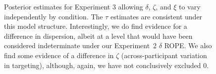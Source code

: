 \documentclass[doc,biblatex,floatsintext]{apa7}
\begin{document}
\begin{figure}
\vspace*{2pt}
\caption{Posterior estimates for Experiment 3 allowing $\delta$, $\zeta$, and $\xi$ to vary independently by condition. The $\tau$ estimates are consistent under this model structure. Interestingly, we do find evidence for a difference in dispersion, albeit at a level that would have been considered indeterminate under our Experiment~2 $\delta$ ROPE. We also find some evidence of a difference in $\zeta$ (across-participant variation in targeting), although, again, we have not conclusively excluded 0.}
\label{supp6}
\end{figure}
\end{document}
